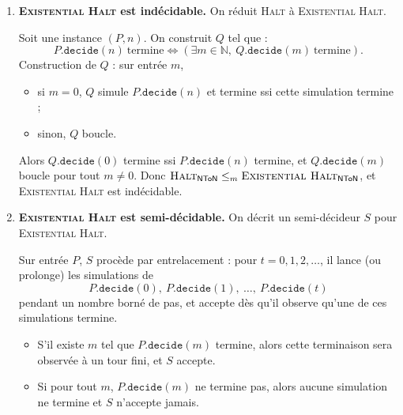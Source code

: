 \begin{exercice}
\begin{corrections}
\begin{enumerate}
      \begin{itemize}
      \item Si $P.\texttt{decide}(n)$ termine, alors pour tout $m$, la simulation finit, donc $Q.\texttt{decide}(m)$ termine.
      \item Si $P.\texttt{decide}(n)$ ne termine pas, alors pour tout $m$, la simulation ne finit jamais, donc $Q.\texttt{decide}(m)$ ne termine pas.
      \end{itemize}
      Donc $(P,n)\in\textsc{Halt}_\mathsf{NToN} \iff Q\in\textsc{Universal Halt}_\mathsf{NToN}$.
      Ainsi \(\textsc{Halt}_\mathsf{NToN} \le_m \textsc{Universal Halt}_\mathsf{NToN}\), et \textsc{Universal Halt} est indécidable.

    \item \textbf{\textsc{Existential Halt} est indécidable.}
      On réduit \textsc{Halt} à \textsc{Existential Halt}.

      Soit une instance $(P,n)$. On construit $Q$ tel que :
      \[
      P.\texttt{decide}(n)\ \text{termine}
      \iff
      (\exists m\in\mathbb{N},\ Q.\texttt{decide}(m)\ \text{termine}).
      \]
      Construction de $Q$ : sur entrée $m$,
      \begin{itemize}
      \item si $m=0$, $Q$ simule $P.\texttt{decide}(n)$ et termine ssi cette simulation termine ;
      \item sinon, $Q$ boucle.
      \end{itemize}
      Alors $Q.\texttt{decide}(0)$ termine ssi $P.\texttt{decide}(n)$ termine, et $Q.\texttt{decide}(m)$ boucle pour tout $m\neq 0$.
      Donc \(\textsc{Halt}_\mathsf{NToN} \le_m \textsc{Existential Halt}_\mathsf{NToN}\), et \textsc{Existential Halt} est indécidable.

    \item \textbf{\textsc{Existential Halt} est semi-décidable.}
      On décrit un semi-décideur $S$ pour \textsc{Existential Halt}.

      Sur entrée $P$, $S$ procède par entrelacement :
      pour $t=0,1,2,\dots$, il lance (ou prolonge) les simulations de
      \[
      P.\texttt{decide}(0),\ P.\texttt{decide}(1),\ \dots,\ P.\texttt{decide}(t)
      \]
      pendant un nombre borné de pas, et accepte dès qu'il observe qu'une de ces simulations termine.

      \begin{itemize}
      \item S'il existe $m$ tel que $P.\texttt{decide}(m)$ termine, alors cette terminaison sera observée à un tour fini, et $S$ accepte.
      \item Si pour tout $m$, $P.\texttt{decide}(m)$ ne termine pas, alors aucune simulation ne termine et $S$ n'accepte jamais.
      \end{itemize}


\end{enumerate}
\end{corrections}
\end{exercice}
